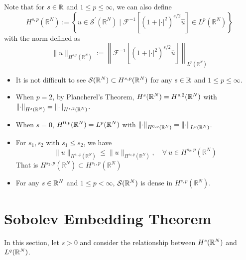 \noindent Note that for $s \in \mathbb{R}$ and $1 \leq p \leq \infty$, we can also define
\begin{equation*}
	H^{s, p}\left(\mathbb{R}^N\right):=\left\{u \in \mathcal{S}^{\prime}\left(\mathbb{R}^N\right) \mid \mathcal{F}^{-1}\left[\left(1+|\cdot|^2\right)^{s / 2} \widehat{u}\right] \in L^p\left(\mathbb{R}^N\right)\right\}
\end{equation*}
with the norm defined as
\begin{equation*}
	\|u\|_{H^{s, p}\left(\mathbb{R}^N\right)}:=\left\|\mathcal{F}^{-1}\left[\left(1+|\cdot|^2\right)^{s / 2} \widehat{u}\right]\right\|_{L^p\left(\mathbb{R}^N\right)}
\end{equation*}
\begin{itemize}
	\item It is not difficult to see $\mathcal{S}(\mathbb{R}^N) \subset H^{s,p}(\mathbb{R}^N)$ for any $s \in \mathbb{R}$ and $1 \leq p \leq \infty$. 

	\item When $p = 2$, by Plancherel's Theorem, $H^s(\mathbb{R}^N) = H^{s,2}(\mathbb{R}^N)$ with $\left\lVert\cdot\right\lVert_{H^s(\mathbb{R}^N)} = \left\lVert\cdot\right\lVert_{H^{s,2}(\mathbb{R}^N)}$. 

	\item When $s = 0$, $H^{0,p}(\mathbb{R}^N) = L^p(\mathbb{R}^N)$ with $\left\lVert\cdot\right\lVert_{H^{0,p}(\mathbb{R}^N)} = \left\lVert\cdot\right\lVert_{L^p(\mathbb{R}^N)}$.

	\item For $s_1,s_2$ with $s_1 \leq s_2$, we have
	\begin{equation*}
		\|u\|_{H^{s_1, p}\left(\mathbb{R}^N\right)} \leq\|u\|_{H^{s_2, p}\left(\mathbb{R}^N\right)},\quad \forall~u \in H^{s_2, p}\left(\mathbb{R}^N\right)
	\end{equation*}
	That is $H^{s_2, p}\left(\mathbb{R}^N\right) \subset H^{s_1, p}\left(\mathbb{R}^N\right)$

	\item For any $s \in \mathbb{R}^N$ and $1 \leq p < \infty$, $\mathcal{S}(\mathbb{R}^N)$ is dense in $H^{s, p}\left(\mathbb{R}^N\right)$.
\end{itemize}

\section{Sobolev Embedding Theorem}

In this section, let $s > 0$ and consider the relationship between $H^s(\mathbb{R}^N)$ and $L^q(\mathbb{R}^N)$.

